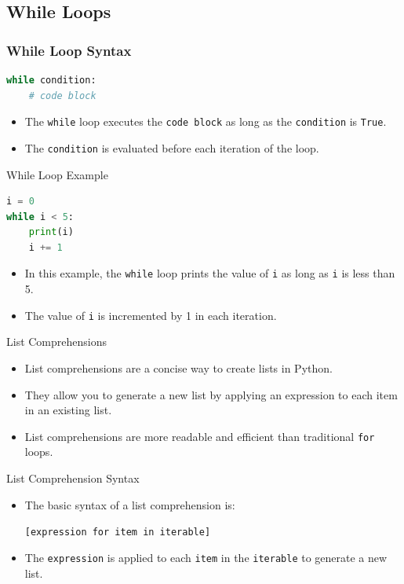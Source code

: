 \subsection{While Loops}
\begin{frame}[fragile]
    \frametitle{While Loop Syntax}
    \begin{lstlisting}[language=Python]
while condition:
    # code block
    \end{lstlisting}
    \begin{itemize}
        \item The \texttt{while} loop executes the \texttt{code block} as long as the \texttt{condition} is \texttt{True}.
        \item The \texttt{condition} is evaluated before each iteration of the loop.
    \end{itemize}
\end{frame}

\begin{frame}[fragile]{While Loop Example}
    \begin{lstlisting}[language=Python]
i = 0
while i < 5:
    print(i)
    i += 1
    \end{lstlisting}
    \begin{itemize}
        \item In this example, the \texttt{while} loop prints the value of \texttt{i} as long as \texttt{i} is less than 5.
        \item The value of \texttt{i} is incremented by 1 in each iteration.
    \end{itemize}
\end{frame}


\begin{frame}{List Comprehensions}
    \begin{itemize}
        \item List comprehensions are a concise way to create lists in Python.
        \item They allow you to generate a new list by applying an expression to each item in an existing list.
        \item List comprehensions are more readable and efficient than traditional \texttt{for} loops.
    \end{itemize}
\end{frame}

\begin{frame}{List Comprehension Syntax}
    \begin{itemize}
        \item The basic syntax of a list comprehension is:
        \begin{center}
            \texttt{[expression for item in iterable]}
        \end{center}
        \item The \texttt{expression} is applied to each \texttt{item} in the \texttt{iterable} to generate a new list.
    \end{itemize}
\end{frame}


